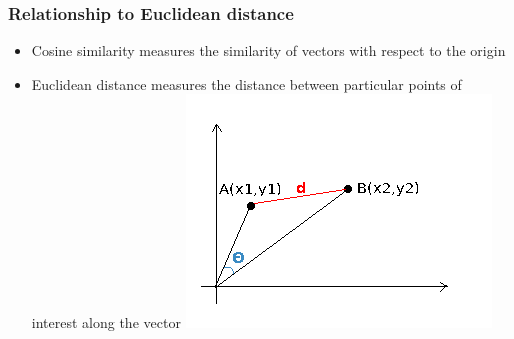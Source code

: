 \documentclass{beamer}
\begin{document}
\begin{frame}
	\frametitle{Relationship to Euclidean distance}
	\begin{itemize}
		\item Cosine similarity measures the similarity of vectors with
		respect to the origin
		\item Euclidean distance measures the distance between particular
		points of interest along the vector
		\includegraphics[width=.5\textwidth]{figures/cosineVEuclid.png}
	\end{itemize}
\end{frame}



\end{document}

